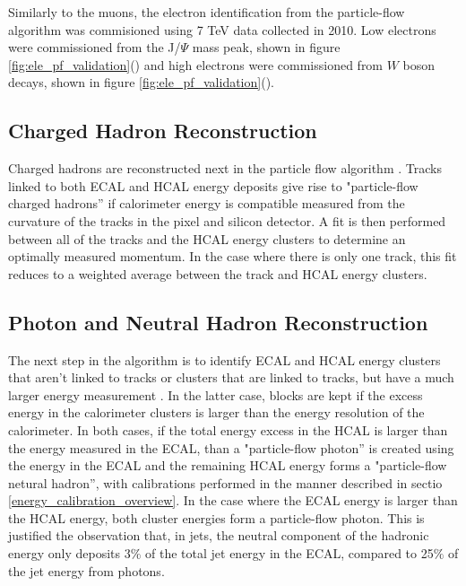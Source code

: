 \par Similarly to the muons, the electron identification from the
particle-flow algorithm was commisioned using 7 TeV data collected in
2010.  Low \PT electrons were commissioned from the J/$\Psi$ mass
peak, shown in figure
\ref{fig:ele_pf_validation}() and high \PT
electrons were commissioned from $W$ boson decays, shown in figure
\ref{fig:ele_pf_validation}(). 

\subsection{Charged Hadron Reconstruction}
\label{charged_hadron_reco_overview}

\par Charged hadrons are reconstructed next in the particle flow
algorithm \cite{CMS-PAS-PFT-09-001}.  Tracks linked to both ECAL and
HCAL energy deposits give rise to "particle-flow charged hadrons'' if
calorimeter energy is compatible measured from the curvature of the
tracks in the pixel and silicon detector.  A fit is then performed
between all of the tracks and the HCAL energy clusters to determine an
optimally measured momentum.  In the case where there is only one
track, this fit reduces to a weighted average between the track and
HCAL energy clusters.  

\subsection{Photon and Neutral Hadron Reconstruction}
\label{neutral_hadron_reco_overview}

\par The next step in the algorithm is to identify ECAL and HCAL
energy clusters that aren't linked to tracks or clusters that are
linked to tracks, but have a much larger energy measurement
.  In the latter case, blocks are kept if the
excess energy in the calorimeter clusters is larger than the energy
resolution of the calorimeter.  In both cases, if the total energy
excess in the HCAL is larger than the energy measured in the ECAL,
than a "particle-flow photon'' is created using the energy in the ECAL
and the remaining HCAL energy forms a "particle-flow netural hadron'',
with calibrations performed in the manner described in
sectio \ref{energy_calibration_overview}.  In the case where the ECAL
energy  is larger than the HCAL energy, both cluster energies form a
particle-flow photon.  This is justified the observation that, in jets,
the neutral component of the hadronic energy only deposits 3$\%$ of
the total jet energy in the ECAL, compared to 25$\%$ of the jet energy
from photons.   


